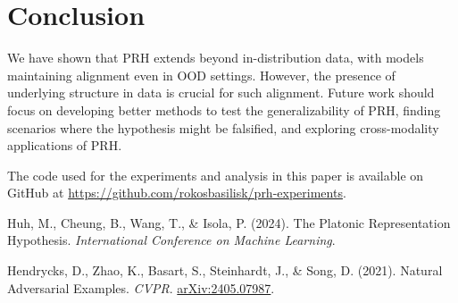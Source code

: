 \documentclass[10pt,a4paper]{article}
\begin{document}
\section{Conclusion}
We have shown that PRH extends beyond in-distribution data, with models maintaining alignment even in OOD settings. However, the presence of underlying structure in data is crucial for such alignment. Future work should focus on developing better methods to test the generalizability of PRH, finding scenarios where the hypothesis might be falsified, and exploring cross-modality applications of PRH.

\vfill
The code used for the experiments and analysis in this paper is available on GitHub at \href{https://github.com/rokosbasilisk/prh-experiments}{https://github.com/rokosbasilisk/prh-experiments}.

\clearpage
\begin{thebibliography}{9}

Huh, M., Cheung, B., Wang, T., \& Isola, P. (2024). The Platonic Representation Hypothesis. \emph{International Conference on Machine Learning}.

Hendrycks, D., Zhao, K., Basart, S., Steinhardt, J., \& Song, D. (2021). Natural Adversarial Examples. \emph{CVPR}. \href{https://arxiv.org/abs/2405.07987}{arXiv:2405.07987}.

\end{thebibliography}
\end{document}
